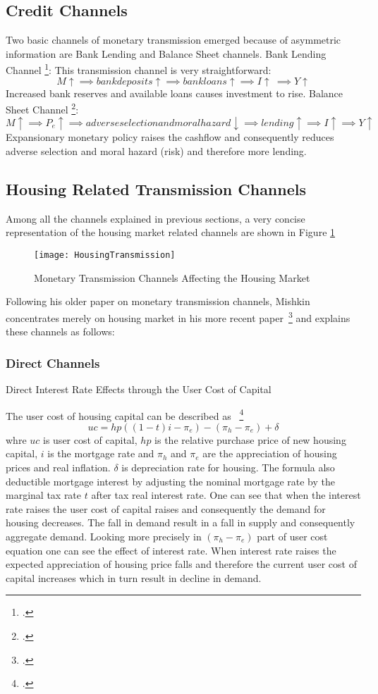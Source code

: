 \subsection{Credit Channels}
Two basic channels of monetary transmission emerged because of asymmetric information are Bank Lending and Balance Sheet channels. 
Bank Lending Channel \footcite[See.][]{Mishkin1996}:
This transmission channel is very straightforward:
 \[M \uparrow \implies bank deposits \uparrow \implies bank loans \uparrow \implies I \uparrow\ \implies Y \uparrow\]
Increased bank reserves and available loans causes investment to rise.
Balance Sheet Channel \footcite[See.][]{Mishkin1996}:
 \[M \uparrow \implies P_e \uparrow \implies adverse selection and moral hazard \downarrow \implies lending \uparrow \implies I \uparrow \implies Y \uparrow\]
Expansionary monetary policy raises the cashflow and consequently reduces adverse selection and moral hazard (risk) and therefore more lending.

\subsection{Housing Related Transmission Channels}

Among all the channels explained in previous sections, a very concise representation of the housing market related channels are shown in Figure \ref{fig:HousingTransmission}
\begin{figure}[H]
\caption{Monetary Transmission Channels Affecting the Housing Market }\label{fig:HousingTransmission}
\texttt{[image: HousingTransmission]}
\\
\cite[Source: See][]{Wadud2009}
\end{figure}

Following his older paper on monetary transmission channels, Mishkin concentrates merely on housing market in his more recent paper~\footcite[See.][]{Mishkin1996} and explains these channels as follows:
\subsubsection{Direct Channels}
Direct Interest Rate Effects through the User Cost of Capital

The user cost of housing capital can be described as ~\footcite[See.][]{Mishkin2007}
 \[ uc = hp((1-t)i - \pi_e) - (\pi_h - \pi_e) + \delta \]
 whre $uc$ is user cost of capital, $hp$ is the relative purchase price of new housing capital, $i$ is the mortgage rate and $\pi_h$ and $\pi_e$ are the appreciation of housing prices and real inflation. $\delta$ is depreciation rate for housing. The formula also deductible mortgage interest by adjusting the nominal mortgage rate by the marginal tax rate $t$ after tax real interest rate. One can see that when the interest rate raises the user cost of capital raises  and consequently the demand for housing decreases. The fall in demand result in a fall in supply and consequently aggregate demand. Looking more precisely in $(\pi_h - \pi_e)$ part of user cost equation one can see the effect of interest rate. When interest rate raises the expected appreciation of housing price falls and therefore the current user cost of capital increases which in turn result in decline in demand. 

